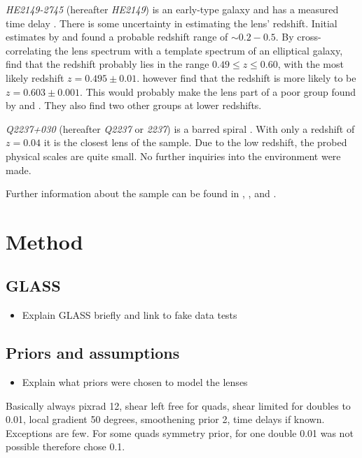 \documentclass[useAMS,usenatbib]{mn2e}
\begin{document}
\textit{HE2149-2745} (hereafter \textit{HE2149}) is an early-type galaxy \citep{2007A&A...465...51E} and has a measured time delay \citep{2002A&A...383...71B}. There is some uncertainty in estimating the lens' redshift. Initial estimates by \cite{1996A&A...315L.405W} and \cite{2000ApJ...543..131K} found a probable redshift range of $\sim0.2-0.5$. By cross-correlating the lens spectrum with a template spectrum of an elliptical galaxy, \cite{2002A&A...383...71B} find that the redshift probably lies in the range $0.49\leq z \leq 0.60$, with the most likely redshift $z=0.495\pm0.01$. \cite{2007A&A...465...51E} however find that the redshift is more likely to be $z=0.603\pm0.001$. This would probably make the lens part of a poor group found by \cite{2006ApJ...641..169M} and \cite{2006ApJ...646...85W}. They also find two other groups at lower redshifts.

\textit{Q2237+030} (hereafter \textit{Q2237} or \textit{2237}) is a barred spiral \citep{1988AJ.....95.1331Y}. With only a redshift of $z=0.04$ it is the closest lens of the sample. Due to the low redshift, the probed physical scales are quite small. No further inquiries into the environment were made.

Further information about the sample can be found in \cite{leier11phd}, \cite{2011ApJ...740...97L}, and \cite{2012A&A...538A..99S}.


\section{Method}\label{sec:method}
\subsection{GLASS}
\begin{itemize}
\item Explain GLASS briefly and link to fake data tests
\end{itemize}

\subsection{Priors and assumptions}
\begin{itemize}
\item Explain what priors were chosen to model the lenses
\end{itemize}

Basically always pixrad 12, shear left free for quads, shear limited for doubles to 0.01, local gradient 50 degrees, smoothening prior 2, time delays if known. Exceptions are few. For some quads symmetry prior, for one double 0.01 was not possible therefore chose 0.1.
\end{document}
